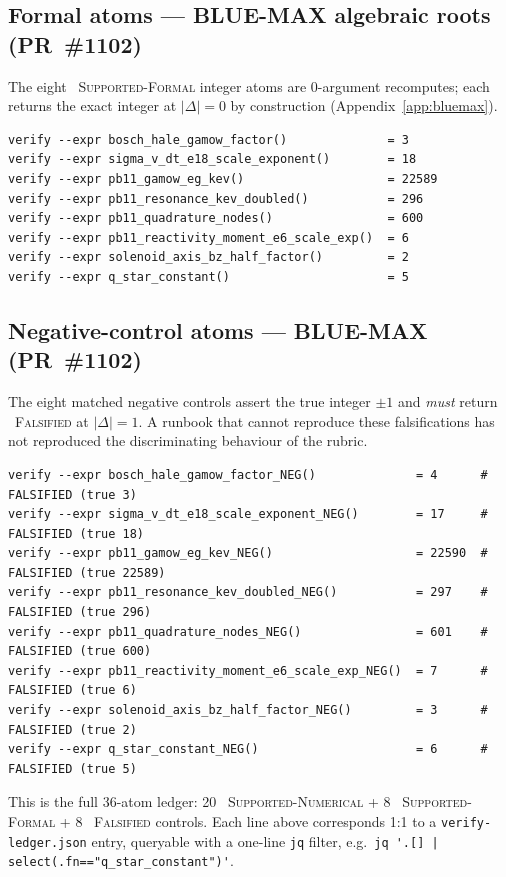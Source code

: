 \subsection{Formal atoms --- BLUE-MAX algebraic roots (PR~\#1102)}
\label{app:repro:formal}

The eight \tierBlue\ \textsc{Supported-Formal} integer atoms are
$0$-argument recomputes; each returns the exact integer at
$|\Delta|=0$ by construction (Appendix~\ref{app:bluemax}).

\begin{lstlisting}
verify --expr bosch_hale_gamow_factor()              = 3
verify --expr sigma_v_dt_e18_scale_exponent()        = 18
verify --expr pb11_gamow_eg_kev()                    = 22589
verify --expr pb11_resonance_kev_doubled()           = 296
verify --expr pb11_quadrature_nodes()                = 600
verify --expr pb11_reactivity_moment_e6_scale_exp()  = 6
verify --expr solenoid_axis_bz_half_factor()         = 2
verify --expr q_star_constant()                      = 5
\end{lstlisting}

\subsection{Negative-control atoms --- BLUE-MAX (PR~\#1102)}
\label{app:repro:negative}

The eight matched negative controls assert the true integer $\pm1$ and
\emph{must} return \tierRed\ \textsc{Falsified} at $|\Delta|=1$. A
runbook that cannot reproduce these falsifications has not reproduced
the discriminating behaviour of the rubric.

\begin{lstlisting}
verify --expr bosch_hale_gamow_factor_NEG()              = 4      # FALSIFIED (true 3)
verify --expr sigma_v_dt_e18_scale_exponent_NEG()        = 17     # FALSIFIED (true 18)
verify --expr pb11_gamow_eg_kev_NEG()                    = 22590  # FALSIFIED (true 22589)
verify --expr pb11_resonance_kev_doubled_NEG()           = 297    # FALSIFIED (true 296)
verify --expr pb11_quadrature_nodes_NEG()                = 601    # FALSIFIED (true 600)
verify --expr pb11_reactivity_moment_e6_scale_exp_NEG()  = 7      # FALSIFIED (true 6)
verify --expr solenoid_axis_bz_half_factor_NEG()         = 3      # FALSIFIED (true 2)
verify --expr q_star_constant_NEG()                      = 6      # FALSIFIED (true 5)
\end{lstlisting}

This is the full 36-atom ledger: 20 \tierGreen\
\textsc{Supported-Numerical} + 8 \tierBlue\ \textsc{Supported-Formal} +
8 \tierRed\ \textsc{Falsified} controls. Each line above corresponds
1:1 to a \texttt{verify-ledger.json} entry, queryable with a one-line
\texttt{jq} filter, e.g.\
\verb#jq '.[] | select(.fn=="q_star_constant")'#.

